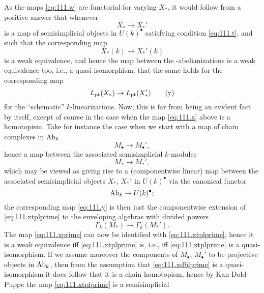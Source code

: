 As the maps \eqref{eq:111.w} are functorial for varying $X_*$, it
would follow from a positive answer that whenever
\begin{equation}
  \label{eq:111.x}
  X_*\to X_*'\tag{x}
\end{equation}
is a map of semisimplicial objects in $U(k)^\bullet$ satisfying
condition \eqref{eq:111.t}, and such that the corresponding map
\begin{equation}
  \label{eq:111.xprime}
  X_*(k) \to X_*'(k)\tag{x'}
\end{equation}
is a weak equivalence, and hence the map between the
\bZ-abelianizations is a weak equivalence too, i.e., a
quasi-isomorphism, that the same holds for the corresponding map
\begin{equation}
  \label{eq:111.y}
  L_{\mathrm{pt}}(X_*)\to L_{\mathrm{pt}}(X_*')\tag{y}
\end{equation}
for the ``schematic'' $k$-linearizations. Now, this is far from being
an evident fact by itself, except of course in the case when the map
\eqref{eq:111.x} above is a homotopism. Take for instance the case
when we start with a map of chain complexes in $\operatorname{Ab}_k$
\begin{equation}
  \label{eq:111.xdblprime}
  M_\bullet \to M_\bullet',\tag{x''}
\end{equation}
hence a map between the associated semisimplicial $k$-modules
\begin{equation}
  \label{eq:111.xtplprime}
  M_*\to M_*',\tag{x'''}
\end{equation}
which may be viewed as giving rise to a (componentwise linear) map
between the associated semisimplicial objects $X_*$, $X_*'$ in
$U(k)^\bullet$ via the canonical functor
\[\operatorname{Ab}_k\to U(k)^\bullet;\]
the corresponding map \eqref{eq:111.y} is then just the componentwise
extension of \eqref{eq:111.xtplprime} to the enveloping algebras with
divided powers
\begin{equation}
  \label{eq:111.yprime}
  \Gamma_k(M_*) \to \Gamma_k(M_*').\tag{y'}
\end{equation}
The map \eqref{eq:111.xprime} can now be identified with
\eqref{eq:111.xtplprime}, hence it is a weak equivalence if{f}
\eqref{eq:111.xtplprime} is, i.e., if{f} \eqref{eq:111.xtplprime} is a
quasi-isomorphism. If we assume moreover the components of
$M_\bullet$, $M_\bullet'$ to be projective objects in $\operatorname{Ab}_k$, then
from the assumption that \eqref{eq:111.xdblprime} is a
quasi-isomorphism it does follow that it is a chain homotopism, hence
by Kan-Dold-Puppe the map \eqref{eq:111.xtplprime} is a semisimplicial
